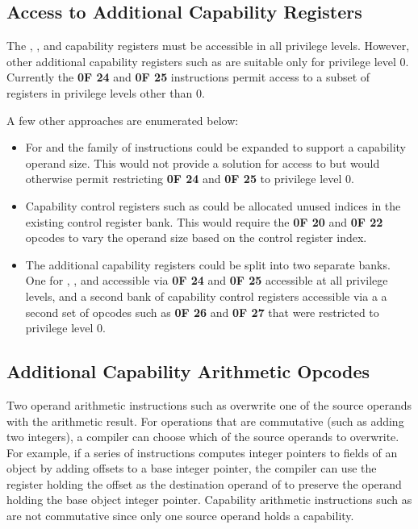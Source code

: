 \subsection{Access to Additional Capability Registers}

The \CFS{}, \CGS{}, and \DDC{} capability registers must be accessible
in all privilege levels.  However, other additional capability
registers such as \KGS{} are suitable only for privilege level 0.
Currently the \textbf{0F 24} and \textbf{0F 25} instructions permit
access to a subset of registers in privilege levels other than 0.

A few other approaches are enumerated below:

\begin{itemize}
  \item For \CFS{} and \CGS{} the  family of
    instructions could be expanded to support a capability operand
    size.  This would not provide a solution for access to \DDC{} but
    would otherwise permit restricting \textbf{0F 24} and \textbf{0F
      25} to privilege level 0.

  \item Capability control registers such as \KGS{} could be allocated
    unused indices in the existing control register bank.  This would
    require the \textbf{0F 20} and \textbf{0F 22} opcodes to vary the
    operand size based on the control register index.

  \item The additional capability registers could be split into two
    separate banks.  One for \CFS{}, \CGS{}, and \DDC{} accessible via
    \textbf{0F 24} and \textbf{0F 25} accessible at all privilege
    levels, and a second bank of capability control registers
    accessible via a a second set of opcodes such as \textbf{0F 26}
    and \textbf{0F 27} that were restricted to privilege level 0.
\end{itemize}

\subsection{Additional Capability Arithmetic Opcodes}

Two operand arithmetic instructions such as  overwrite
one of the source operands with the arithmetic result.  For operations
that are commutative (such as adding two integers), a compiler can
choose which of the source operands to overwrite.  For example, if a
series of instructions computes integer pointers to fields of an
object by adding offsets to a base integer pointer, the compiler can
use the register holding the offset as the destination operand of
 to preserve the operand holding the base object
integer pointer.  Capability arithmetic instructions such as
 are not commutative since only one source
operand holds a capability.

